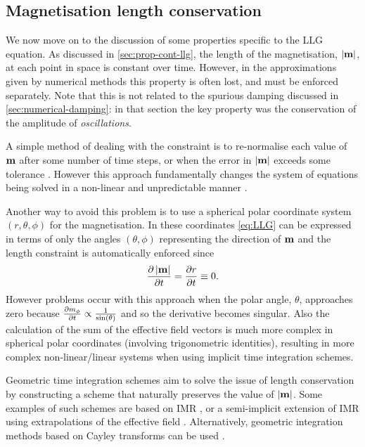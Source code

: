 \subsection{Magnetisation length conservation}
\label{sec:ensuring-constant-mv}

We now move on to the discussion of some properties specific to the LLG equation.
As discussed in \cref{sec:prop-cont-llg}, the length of the magnetisation, $\left|{\boldsymbol{\mathrm{m}}} \right|$, at each point in space is constant over time.
However, in the approximations given by numerical methods this property is often lost, and must be enforced separately.
Note that this is not related to the spurious damping discussed in \cref{sec:numerical-damping}: in that section the key property was the conservation of the amplitude of \emph{oscillations}.

A simple method of dealing with the constraint is to re-normalise each value of $\boldsymbol{\mathrm{m}}$ after some number of time steps, or when the error in $\left|{\boldsymbol{\mathrm{m}}} \right|$ exceeds some tolerance \cite{Fidler2000}.
However this approach fundamentally changes the system of equations being solved in a non-linear and unpredictable manner \cite{Lewis2003}.

Another way to avoid this problem is to use a spherical polar coordinate system $(r,\theta,\phi)$ for the magnetisation.
In these coordinates \cref{eq:LLG} can be expressed in terms of only the angles $(\theta,\phi)$ representing the direction of $\boldsymbol{\mathrm{m}}$ and the length constraint is automatically enforced since
\begin{equation}
  \label{eq:40}
  \frac{\partial \left|{\boldsymbol{\mathrm{m}}} \right|}{\partial t} = \frac{\partial r}{\partial t} \equiv 0.
\end{equation}
However problems occur with this approach when the polar angle, $\theta$, approaches zero because $\frac{\partial m_{\phi}}{\partial t} \propto \frac{1}{\sin(\theta)}$ \cite{Fukushima2005} and so the derivative becomes singular.
Also the calculation of the sum of the effective field vectors is much more complex in spherical polar coordinates (involving trigonometric identities), resulting in more complex non-linear/linear systems when using implicit time integration schemes.

Geometric time integration schemes aim to solve the issue of length conservation by constructing a scheme that naturally preserves the value of $\left|{\boldsymbol{\mathrm{m}}} \right|$.
Some examples of such schemes are based on IMR \cite{DAquino2005}, or a semi-implicit extension of IMR using extrapolations of the effective field \cite{Spargo2003,Serpico2001}.
Alternatively, geometric integration methods based on Cayley transforms can be used \cite{Lewis2003,Bottauscio2011}.

